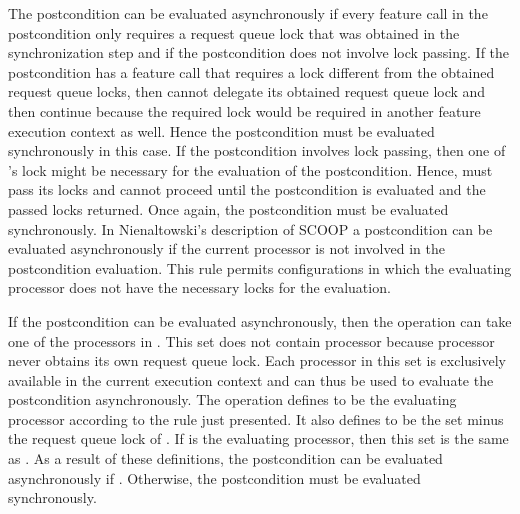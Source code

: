 \begin{clarification}
The postcondition can be evaluated asynchronously if every feature call in the postcondition only requires a request queue lock that was obtained in the synchronization step and if the postcondition does not involve lock passing. If the postcondition has a feature call that requires a lock different from the obtained request queue locks, then  cannot delegate its obtained request queue lock and then continue because the required lock would be required in another feature execution context as well. Hence the postcondition must be evaluated synchronously in this case. If the postcondition involves lock passing, then one of 's lock might be necessary for the evaluation of the postcondition. Hence,  must pass its locks and cannot proceed until the postcondition is evaluated and the passed locks returned. Once again, the postcondition must be evaluated synchronously. In Nienaltowski's description of SCOOP \cite{nienaltowski:2007:SCOOP} a postcondition can be evaluated asynchronously if the current processor is not involved in the postcondition evaluation. This rule permits configurations in which the evaluating processor does not have the necessary locks for the evaluation.
\end{clarification}

If the postcondition can be evaluated asynchronously, then the operation can take one of the processors in . This set does not contain processor  because processor  never obtains its own request queue lock. Each processor in this set is exclusively available in the current execution context and can thus be used to evaluate the postcondition asynchronously. The  operation defines  to be the evaluating processor according to the rule just presented. It also defines  to be the set  minus the request queue lock of . If  is the evaluating processor, then this set is the same as . As a result of these definitions, the postcondition can be evaluated asynchronously if . Otherwise, the postcondition must be evaluated synchronously.


